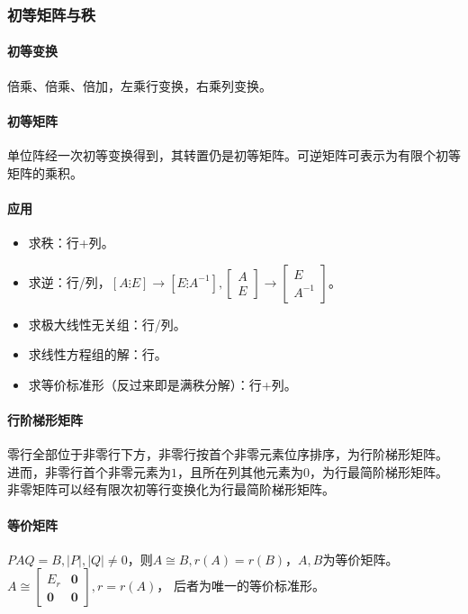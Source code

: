 \documentclass[
12pt, %
a4paper, 
oneside, %
headinclude,footinclude, %
]{scrartcl}
\begin{document}
\subsubsection[初等矩阵与秩]{初等矩阵与秩}
\paragraph{初等变换}
倍乘、倍乘、倍加，左乘行变换，右乘列变换。
\paragraph{初等矩阵}
单位阵经一次初等变换得到，其转置仍是初等矩阵。可逆矩阵可表示为有限个初等矩阵的乘积。
\paragraph{应用}
\begin{itemize}
\item 求秩：行+列。
\item 求逆：行/列，$ [A \vdots E] \rightarrow [E \vdots A^{-1}], \begin{bmatrix} A \\ E \end{bmatrix} \rightarrow \begin{bmatrix} E \\ A^{-1} \end{bmatrix} $。
\item 求极大线性无关组：行/列。
\item 求线性方程组的解：行。
\item 求等价标准形（反过来即是满秩分解）：行+列。
\end{itemize}
\paragraph{行阶梯形矩阵}
零行全部位于非零行下方，非零行按首个非零元素位序排序，为行阶梯形矩阵。
进而，非零行首个非零元素为$ 1 $，且所在列其他元素为$ 0 $，为行最简阶梯形矩阵。
非零矩阵可以经有限次初等行变换化为行最简阶梯形矩阵。
\paragraph{等价矩阵}
$ PAQ = B, |P|,|Q| \neq 0 $，则$ A \cong B, r(A) = r(B) $，$ A,B $为等价矩阵。
$ A \cong \begin{bmatrix} E_r & \mathbf{0} \\ \mathbf{0} & \mathbf{0} \end{bmatrix}, r = r(A) $，
后者为唯一的等价标准形。
\end{document}
